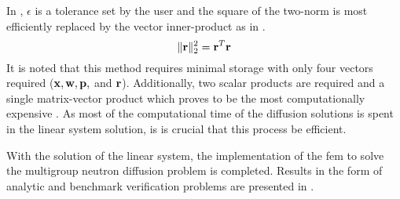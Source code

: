     In , $\epsilon$ is a tolerance set by the user 
    and the square of the two-norm is most efficiently replaced by the vector
    inner-product as in . 
    \begin{equation}
      \label{eq:two_norm_inner}
      \|\mathbf{r}\|_2^2 = \mathbf{r}^{T} \mathbf{r}
    \end{equation}
    It is noted that this method requires minimal storage with only four vectors 
    required ($\mathbf{x}, \mathbf{w}, \mathbf{p},$ and $\mathbf{r}$). Additionally, two scalar products 
    are required and a single matrix-vector product which proves to be the most 
    computationally expensive \cite{Kelley1995IterativeEquations}. As most of 
    the computational time of the diffusion solutions is spent in the linear 
    system solution, is is crucial that this process be efficient.

    With the solution of the linear system, the implementation of the \gls{fem}
    to solve the multigroup neutron diffusion problem is completed. Results in 
    the form of analytic and benchmark verification problems are presented in
    .
